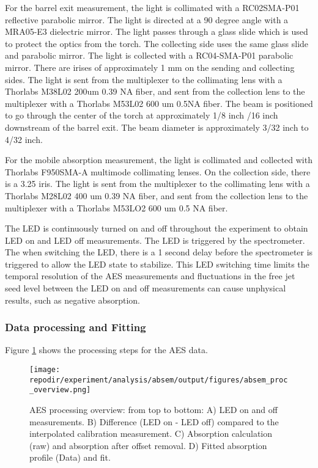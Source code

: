 For the barrel exit measurement, the light is collimated with a RC02SMA-P01 reflective parabolic mirror. The light is directed at a 90 degree angle with a MRA05-E3 dielectric mirror. The light passes through a glass slide which is used to protect the optics from the torch. The collecting side uses the same glass slide and parabolic mirror. The light is collected with a RC04-SMA-P01 parabolic mirror. There are irises of approximately 1 mm on the sending and collecting sides. The light is sent from the multiplexer to the collimating lens with a Thorlabs M38L02 200um 0.39 NA fiber, and sent from the collection lens to the multiplexer with a Thorlabs M53L02 600 um 0.5NA fiber. The beam is positioned to go through the center of the torch at approximately 1/8 inch /16 inch downstream of the barrel exit. The beam diameter is approximately 3/32 inch to 4/32 inch. 

For the mobile absorption measurement, the light is collimated and collected with Thorlabs F950SMA-A multimode collimating lenses.  On the collection side, there is a 3.25  iris. The light is sent from the multiplexer to the collimating lens with a Thorlabs M28L02 400 um 0.39 NA fiber, and sent from the collection lens to the multiplexer with a Thorlabs M53LO2 600 um 0.5 NA fiber. 

The LED is continuously turned on and off throughout the experiment to obtain LED on and LED off measurements. The LED is triggered by the spectrometer. The when switching the LED, there is a 1 second delay before the spectrometer is triggered to allow the LED state to stabilize. This LED switching time limits the temporal resolution of the AES measurements and fluctuations in the free jet seed level between the LED on and off measurements can cause unphysical results, such as negative absorption. 

\subsubsection{Data processing and Fitting}

Figure \ref{fig:SI_AES_proc_overview} shows the processing steps for the AES data.

\begin{figure}[]
    \centering
    \texttt{[image: \\repodir/experiment/analysis/absem/output/figures/absem\_proc\_overview.png]}
    \caption{AES processing overview: from top to bottom: A) LED on and off measurements. B) Difference (LED on - LED off) compared to the interpolated calibration measurement. C) Absorption calculation (raw) and absorption after offset removal. D) Fitted absorption profile (Data) and fit.}
    \label{fig:SI_AES_proc_overview}
\end{figure}





